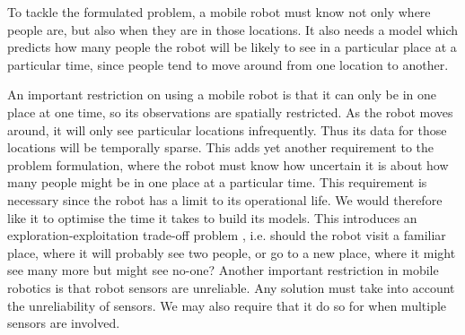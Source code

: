 To tackle the formulated problem, a mobile robot must know not only where people are, but also when they are in those locations. It also needs a model which predicts how many people the robot will be likely to see in a particular place at a particular time, since people tend to move around from one location to another. 

An important restriction on using a mobile robot is that it can only be in one place at one time, so its observations are spatially restricted. As the robot moves around, it will only see particular locations infrequently. Thus its data for those locations will be temporally sparse. This adds yet another requirement to the problem formulation, where the robot must know how uncertain it is about how many people might be in one place at a particular time. This requirement is necessary since the robot has a limit to its operational life. We would therefore like it to optimise the time it takes to build its models. This introduces an exploration-exploitation trade-off problem \cite{wyatt1998exploration, 1413255, AUDIBERT20091876}, i.e. should the robot visit a familiar place, where it will probably see two people, or go to a new place, where it might see many more but might see no-one?  Another important restriction in mobile robotics is that robot sensors are unreliable. Any solution must take into account the unreliability of sensors. We may also require that it do so for when multiple sensors are involved.
